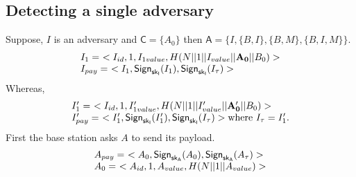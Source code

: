 \documentclass[%
  slidesonly,%
  semlayer%
  ]{seminar}                                  %
\newcommand{\sk}{\sf{sk}}
\begin{document}
\begin{slide}
    \subsection*{Detecting a single adversary}
        \vfill
        Suppose, $I$ is an adversary and $\textsf{C} = \{A_{0}\}$ then $\textsf{A}=\{I,\{B,I\},\{B,M\},\{B,I,M\}\}$.
        \begin{equation*}
          \begin{array}{l}
            I_{1} =\ <I_{id}, 1, I_{1value}, H(N||1||I_{value}||\mathbf{A_{0}}||B_{0})> \\ 
            I_{pay} =\ <I_{1}, \textsf{Sign}_{\sk_{I}}(I_{1}), \textsf{Sign}_{\sk_{I}}(I_{\tau})>\\
          \end{array}
        \end{equation*}
        Whereas,
        \begin{equation*}
          \begin{array}{l}
            I'_{1} =\ <I_{id}, 1, I'_{1value}, H(N||1||I'_{value}||\mathbf{A'_{0}}||B_{0})> \\
            I'_{pay} =\ <I'_{1}, \textsf{Sign}_{\sk_{I}}(I'_{1}), \textsf{Sign}_{\sk_{I}}(I_{\tau})> \mbox{where}\ I_{\tau} = I'_{1}.\\
          \end{array}
        \end{equation*}
        First the base station asks $A$ to send its payload.
        \begin{equation*}
          \begin{array}{l}
          A_{pay} =\ <A_{0}, \textsf{Sign}_{\sk_{A}}(A_{0}), \textsf{Sign}_{\sk_{A}}(A_{\tau})>\\
          A_{0} =\ <A_{id}, 1, A_{value}, H(N||1||A_{value})>
          \end{array}
        \end{equation*}


\end{slide}
\end{document}
